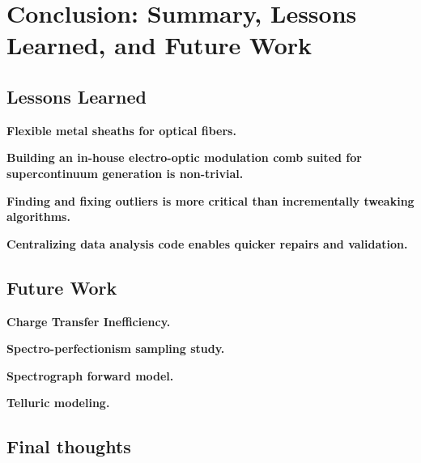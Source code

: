 \chapter{Conclusion: Summary, Lessons Learned, and Future Work}\label{chapter:conclusion}





\section{Lessons Learned}

\textbf{Flexible metal sheaths for optical fibers.}

\textbf{Building an in-house electro-optic modulation comb suited for supercontinuum generation is non-trivial.}

\textbf{Finding and fixing outliers is more critical than incrementally tweaking algorithms.}

\textbf{Centralizing data analysis code enables quicker repairs and validation.}




\section{Future Work}

\textbf{Charge Transfer Inefficiency.}

\textbf{Spectro-perfectionism sampling study.}

\textbf{Spectrograph forward model.}

\textbf{Telluric modeling.}


\section{Final thoughts}